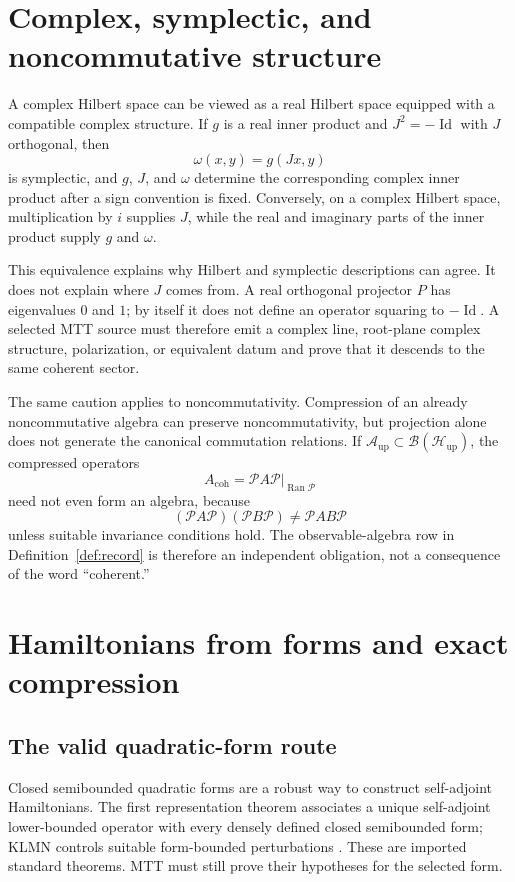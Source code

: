 \documentclass[11pt]{article}
\theoremstyle{definition}
\theoremstyle{remark}
\newcommand{\cA}{\mathcal A}
\newcommand{\cB}{\mathcal B}
\newcommand{\cH}{\mathcal H}
\newcommand{\cP}{\mathcal P}
\newcommand{\Id}{\operatorname{Id}}
\newcommand{\Ran}{\operatorname{Ran}}
\begin{document}
\section{Complex, symplectic, and noncommutative structure}
\label{sec:complex}

A complex Hilbert space can be viewed as a real Hilbert space equipped with a
compatible complex structure.  If \(g\) is a real inner product and
\(J^2=-\Id\) with \(J\) orthogonal, then
\[
\omega(x,y)=g(Jx,y)
\]
is symplectic, and \(g\), \(J\), and \(\omega\) determine the corresponding
complex inner product after a sign convention is fixed.  Conversely, on a
complex Hilbert space, multiplication by \(i\) supplies \(J\), while the
real and imaginary parts of the inner product supply \(g\) and \(\omega\).

This equivalence explains why Hilbert and symplectic descriptions can agree.
It does not explain where \(J\) comes from.  A real orthogonal projector
\(P\) has eigenvalues \(0\) and \(1\); by itself it does not define an
operator squaring to \(-\Id\).  A selected MTT source must therefore emit a
complex line, root-plane complex structure, polarization, or equivalent
datum and prove that it descends to the same coherent sector.

The same caution applies to noncommutativity.  Compression of an already
noncommutative algebra can preserve noncommutativity, but projection alone
does not generate the canonical commutation relations.  If
\(\cA_{\mathrm{up}}\subset\cB(\cH_{\mathrm{up}})\), the compressed operators
\[
A_{\mathrm{coh}}=\cP A\cP\big|_{\Ran\cP}
\]
need not even form an algebra, because
\[
(\cP A\cP)(\cP B\cP)
\neq
\cP AB\cP
\]
unless suitable invariance conditions hold.  The observable-algebra row in
Definition~\ref{def:record} is therefore an independent obligation, not a consequence
of the word ``coherent.''

\section{Hamiltonians from forms and exact compression}
\label{sec:hamiltonian}

\subsection{The valid quadratic-form route}

Closed semibounded quadratic forms are a robust way to construct
self-adjoint Hamiltonians.  The first representation theorem associates a
unique self-adjoint lower-bounded operator with every densely defined closed
semibounded form; KLMN controls suitable form-bounded perturbations
\cite{Kato1995,ReedSimon1972}.  These are imported standard theorems.  MTT
must still prove their hypotheses for the selected form.
\end{document}
